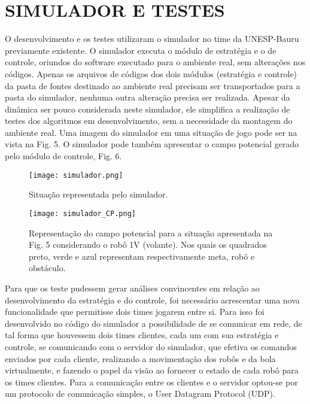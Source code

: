 
\section{SIMULADOR E TESTES}

O desenvolvimento e os testes utilizaram o simulador no
time da UNESP-Bauru previamente existente. O simulador
executa o módulo de estratégia e o de controle, oriundos do
software executado para o ambiente real, sem alterações nos
códigos. Apenas os arquivos de códigos dos dois módulos
(estratégia e controle) da pasta de fontes destinado ao ambiente
real precisam ser transportados para a pasta do simulador,
nenhuma outra alteração precisa ser realizada. Apesar da
dinâmica ser pouco considerada neste simulador, ele simplifica
a realização de testes dos algoritmos em desenvolvimento, sem
a necessidade da montagem do ambiente real. Uma imagem do
simulador em uma situação de jogo pode ser na vista na Fig. 5.
O simulador pode também apresentar o campo potencial
gerado pelo módulo de controle, Fig. 6.

\begin{figure}[!htb]
\centering
\texttt{[image: simulador.png]}
\caption{Situação representada pelo simulador.}
\label{Rotulo}
\end{figure}

\begin{figure}[!htb]
\centering
\texttt{[image: simulador\_CP.png]}
\caption{Representação do campo potencial para a situação apresentada na
Fig. 5 considerando o robô 1V (volante). Nos quais os quadrados preto, verde
e azul representam respectivamente meta, robô e obstáculo.}
\label{Rotulo}
\end{figure}

Para que os teste pudessem gerar análises convincentes em
relação ao desenvolvimento da estratégia e do controle, foi
necessário acrescentar uma nova funcionalidade que
permitisse dois times jogarem entre si. Para isso foi
desenvolvido no código do simulador a possibilidade de se
comunicar em rede, de tal forma que houvessem dois times
clientes, cada um com sua estratégia e controle, se
comunicando com o servidor do simulador, que efetiva os
comandos enviados por cada cliente, realizando a
movimentação dos robôs e da bola virtualmente, e fazendo o
papel da visão ao fornecer o estado de cada robô para os times
clientes. Para a comunicação entre os clientes e o servidor
optou-se por um protocolo de comunicação simples, o User
Datagram Protocol (UDP).

